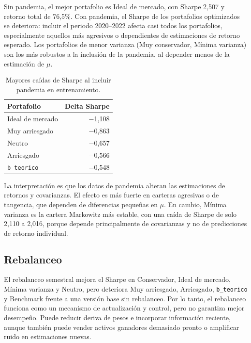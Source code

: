 Sin pandemia, el mejor portafolio es Ideal de mercado, con Sharpe 2,507 y
retorno total de 76,5\%. Con pandemia, el Sharpe de los portafolios optimizados
se deteriora: incluir el periodo 2020--2022 afecta casi todos los portafolios,
especialmente aquellos m\'as agresivos o dependientes de estimaciones de retorno
esperado. Los portafolios de menor varianza (Muy conservador, M\'inima varianza)
son los m\'as robustos a la inclusi\'on de la pandemia, al depender menos de la
estimaci\'on de $\mu$.

\begin{table}[H]
\centering
\caption{Mayores ca\'idas de Sharpe al incluir pandemia en entrenamiento.}
\label{tab:anexo4_delta_sharpe}
\small
\begin{tabular}{@{}lr@{}}
\toprule
Portafolio & Delta Sharpe \\
\midrule
Ideal de mercado & $-$1,108 \\
Muy arriesgado & $-$0,863 \\
Neutro & $-$0,657 \\
Arriesgado & $-$0,566 \\
\texttt{b\_teorico} & $-$0,548 \\
\bottomrule
\end{tabular}
\end{table}

La interpretaci\'on es que los datos de pandemia alteran las estimaciones de
retornos y covarianzas. El efecto es m\'as fuerte en carteras agresivas o de
tangencia, que dependen de diferencias peque\~nas en $\mu$. En cambio, M\'inima
varianza es la cartera Markowitz m\'as estable, con una ca\'ida de Sharpe de solo
2,110 a 2,016, porque depende principalmente de covarianzas y no de
predicciones de retorno individual.

\subsection*{Rebalanceo}

El rebalanceo semestral mejora el Sharpe en Conservador, Ideal de mercado,
M\'inima varianza y Neutro, pero deteriora Muy arriesgado, Arriesgado,
\texttt{b\_teorico} y Benchmark frente a una versi\'on base sin rebalanceo. Por
lo tanto, el rebalanceo funciona como un mecanismo de actualizaci\'on y control,
pero no garantiza mejor desempe\~no. Puede reducir deriva de pesos e incorporar
informaci\'on reciente, aunque tambi\'en puede vender activos ganadores demasiado
pronto o amplificar ruido en estimaciones nuevas.


